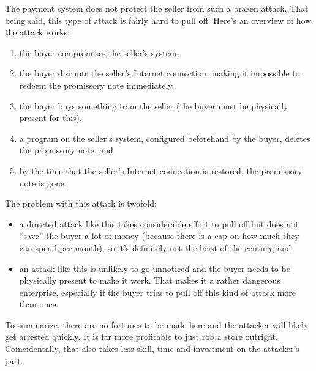 \documentclass[12pt,a4paper]{article}
\begin{document}
\begin{multicols}{2}
	The payment system does not protect the seller from such a brazen attack. That being said, this type of attack is fairly hard to pull off. Here's an overview of how the attack works:

	\begin{enumerate}
		\item the buyer compromises the seller's system,
		\item the buyer disrupts the seller's Internet connection, making it impossible to redeem the promissory note immediately,
		\item the buyer buys something from the seller (the buyer must be physically present for this),
		\item a program on the seller's system, configured beforehand by the buyer, deletes the promissory note, and
		\item by the time that the seller's Internet connection is restored, the promissory note is gone.
	\end{enumerate}

	The problem with this attack is twofold:

	\begin{itemize}
		\item a directed attack like this takes considerable effort to pull off but does not ``save'' the buyer a lot of money (because there is a cap on how much they can spend per month), so it's definitely not the heist of the century, and
		\item an attack like this is unlikely to go unnoticed and the buyer needs to be physically present to make it work. That makes it a rather dangerous enterprise, especially if the buyer tries to pull off this kind of attack more than once.
	\end{itemize}

	To summarize, there are no fortunes to be made here and the attacker will likely get arrested quickly. It is far more profitable to just rob a store outright. Coincidentally, that also takes less skill, time and investment on the attacker's part.
	
	
	 
	
	\end{multicols}
\end{document}
